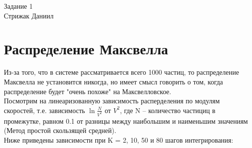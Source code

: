 



\begin{center}
    \Large{Задание 1}\\
    Стрижак Даниил
\end{center}
\section{Распределение Максвелла}
Из-за того, что в системе рассматривается всего 1000 частиц, то распределение Максвелла не установится никогда, но имеет смысл говорить о том, когда распределение будет "очень похоже" на Максвелловское. \\

Посмотрим на линеаризованную зависимость расперделения по модулям скоростей, т.е. зависимость $\ln{\frac{N}{V^2}}$ от $V^2$, где N -- количество частициц в промежутке, равном 0.1 от разницы между наибольшим и наименьшим значениям  (Метод простой скользящей средней).  \\

Ниже приведены зависимости при K = 2, 10, 50 и 80 шагов интегрирования:

